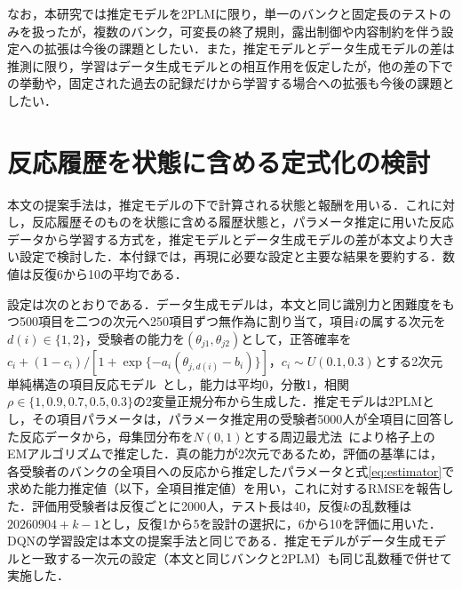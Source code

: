 \documentclass[paper]{ieicej}
\begin{document}
なお，本研究では推定モデルを2PLMに限り，単一のバンクと固定長のテストのみを扱ったが，複数のバンク，可変長の終了規則，露出制御や内容制約を伴う設定への拡張は今後の課題としたい．また，推定モデルとデータ生成モデルの差は推測に限り，学習はデータ生成モデルとの相互作用を仮定したが，他の差の下での挙動や，固定された過去の記録だけから学習する場合への拡張も今後の課題としたい．




\appendix
\section{反応履歴を状態に含める定式化の検討}\label{app:history}

本文の提案手法は，推定モデルの下で計算される状態と報酬を用いる．これに対し，反応履歴そのものを状態に含める履歴状態と，パラメータ推定に用いた反応データから学習する方式を，推定モデルとデータ生成モデルの差が本文より大きい設定で検討した．本付録では，再現に必要な設定と主要な結果を要約する．数値は反復6から10の平均である．

設定は次のとおりである．データ生成モデルは，本文と同じ識別力と困難度をもつ500項目を二つの次元へ250項目ずつ無作為に割り当て，項目$i$の属する次元を$d(i)\in\{1,2\}$，受験者の能力を$(\theta_{j1},\theta_{j2})$として，正答確率を$c_i+(1-c_i)/[1+\exp\{-a_i(\theta_{j,d(i)}-b_i)\}]$，$c_i\sim U(0.1,0.3)$とする2次元単純構造の項目反応モデル~\cite{Reckase2009}とし，能力は平均0，分散1，相関$\rho\in\{1,0.9,0.7,0.5,0.3\}$の2変量正規分布から生成した．推定モデルは2PLMとし，その項目パラメータは，パラメータ推定用の受験者5000人が全項目に回答した反応データから，母集団分布を$N(0,1)$とする周辺最尤法~\cite{BockAitkin1981}により格子上のEMアルゴリズムで推定した．真の能力が2次元であるため，評価の基準には，各受験者のバンクの全項目への反応から推定したパラメータと式\eqref{eq:estimator}で求めた能力推定値（以下，全項目推定値）を用い，これに対するRMSEを報告した．評価用受験者は反復ごとに2000人，テスト長は40，反復$k$の乱数種は$20260904+k-1$とし，反復1から5を設計の選択に，6から10を評価に用いた．DQNの学習設定は本文の提案手法と同じである．推定モデルがデータ生成モデルと一致する一次元の設定（本文と同じバンクと2PLM）も同じ乱数種で併せて実施した．
\end{document}
